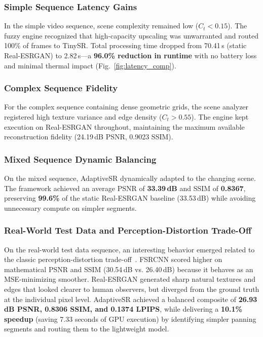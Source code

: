 \documentclass[conference]{IEEEtran}
\begin{document}
\subsubsection{Simple Sequence Latency Gains}
In the simple video sequence, scene complexity remained low ($C_t < 0.15$). The fuzzy engine recognized that high-capacity upscaling was unwarranted and routed 100\% of frames to TinySR. Total processing time dropped from 70.41\,s (static Real-ESRGAN) to 2.82\,s—a \textbf{96.0\% reduction in runtime} with no battery loss and minimal thermal impact (Fig.~\ref{fig:latency_comp}).

\subsubsection{Complex Sequence Fidelity}
For the complex sequence containing dense geometric grids, the scene analyzer registered high texture variance and edge density ($C_t > 0.55$). The engine kept execution on Real-ESRGAN throughout, maintaining the maximum available reconstruction fidelity (24.19\,dB PSNR, 0.9023 SSIM).

\subsubsection{Mixed Sequence Dynamic Balancing}
On the mixed sequence, AdaptiveSR dynamically adapted to the changing scene. The framework achieved an average PSNR of \textbf{33.39\,dB} and SSIM of \textbf{0.8367}, preserving \textbf{99.6\%} of the static Real-ESRGAN baseline (33.53\,dB) while avoiding unnecessary compute on simpler segments.

\subsubsection{Real-World Test Data and Perception-Distortion Trade-Off}
On the real-world test data sequence, an interesting behavior emerged related to the classic perception-distortion trade-off~\cite{blau2018perception}. FSRCNN scored higher on mathematical PSNR and SSIM (30.54\,dB vs. 26.40\,dB) because it behaves as an MSE-minimizing smoother. Real-ESRGAN generated sharp natural textures and edges that looked clearer to human observers, but diverged from the ground truth at the individual pixel level. AdaptiveSR achieved a balanced composite of \textbf{26.93\,dB PSNR, 0.8306 SSIM, and 0.1374 LPIPS}, while delivering a \textbf{10.1\% speedup} (saving 7.33 seconds of GPU execution) by identifying simpler panning segments and routing them to the lightweight model.
\end{document}
